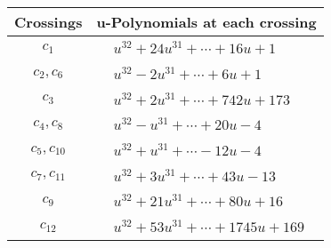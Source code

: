\documentclass[1p]{elsarticle_modified}
\theoremstyle{definition}
\begin{document}
\begin{tabular}{m{50pt}|m{274pt}}
Crossings & \hspace{64pt}u-Polynomials at each crossing \\
\hline $$\begin{aligned}c_{1}\end{aligned}$$&$\begin{aligned}
&u^{32}+24 u^{31}+\cdots+16 u+1
\end{aligned}$\\
\hline $$\begin{aligned}c_{2},c_{6}\end{aligned}$$&$\begin{aligned}
&u^{32}-2 u^{31}+\cdots+6 u+1
\end{aligned}$\\
\hline $$\begin{aligned}c_{3}\end{aligned}$$&$\begin{aligned}
&u^{32}+2 u^{31}+\cdots+742 u+173
\end{aligned}$\\
\hline $$\begin{aligned}c_{4},c_{8}\end{aligned}$$&$\begin{aligned}
&u^{32}- u^{31}+\cdots+20 u-4
\end{aligned}$\\
\hline $$\begin{aligned}c_{5},c_{10}\end{aligned}$$&$\begin{aligned}
&u^{32}+u^{31}+\cdots-12 u-4
\end{aligned}$\\
\hline $$\begin{aligned}c_{7},c_{11}\end{aligned}$$&$\begin{aligned}
&u^{32}+3 u^{31}+\cdots+43 u-13
\end{aligned}$\\
\hline $$\begin{aligned}c_{9}\end{aligned}$$&$\begin{aligned}
&u^{32}+21 u^{31}+\cdots+80 u+16
\end{aligned}$\\
\hline $$\begin{aligned}c_{12}\end{aligned}$$&$\begin{aligned}
&u^{32}+53 u^{31}+\cdots+1745 u+169
\end{aligned}$\\
\hline
\end{tabular}\\~\\
\end{document}
